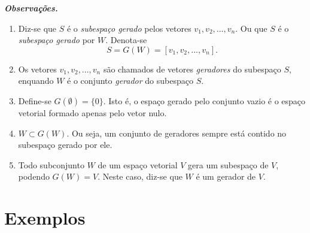 \vspace{0.3cm}
\textbf{\textit{Observações.}}
  \begin{enumerate}%
\item Diz-se que $S$ é o  \textit{subespaço  gerado} pelos  vetores  $v_1, v_2,..., v_n$. Ou que $S$ é o  \textit{subespaço  gerado} por $W$. Denota-se $$S=G(W)=[v_1, v_2,..., v_n].$$

\item Os vetores  $v_1, v_2,..., v_n$ são chamados de vetores \textit{geradores}  do subespaço $S$, enquando $W$ é o conjunto \textit{gerador}  do subespaço $S$.

\item Define-se $G(\emptyset)=\{0\}$. Isto é, o espaço gerado pelo conjunto vazio é  o espaço vetorial formado apenas pelo vetor nulo.

\item $W \subset G(W)$. Ou seja, um conjunto de geradores  sempre está contido no subespaço gerado por ele.

\item Todo subconjunto $W $ de um espaço vetorial $V$ gera um subespaço de $V$, podendo $G(W)=V$. Neste caso, diz-se que  $W$ é um gerador de $V$.

\end{enumerate}

\section{Exemplos}

